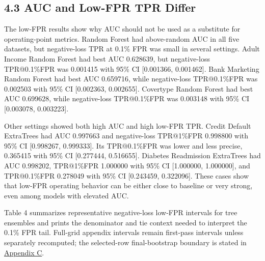 \documentclass[
  10pt,
  twocolumn]{article}
\begin{document}
\hypertarget{auc-and-low-fpr-tpr-differ}{%
\subsection{4.3 AUC and Low-FPR TPR Differ}\label{auc-and-low-fpr-tpr-differ}}

The low-FPR results show why AUC should not be used as a substitute for operating-point metrics. Random Forest had above-random AUC in all five datasets, but negative-loss TPR at 0.1\% FPR was small in several settings. Adult Income Random Forest had best AUC 0.628639, but negative-loss TPR@0.1\%FPR was 0.001415 with 95\% CI {[}0.001366, 0.001462{]}. Bank Marketing Random Forest had best AUC 0.659716, while negative-loss TPR@0.1\%FPR was 0.002503 with 95\% CI {[}0.002363, 0.002655{]}. Covertype Random Forest had best AUC 0.699628, while negative-loss TPR@0.1\%FPR was 0.003148 with 95\% CI {[}0.003078, 0.003223{]}.

Other settings showed both high AUC and high low-FPR TPR. Credit Default ExtraTrees had AUC 0.997663 and negative-loss TPR@1\%FPR 0.998800 with 95\% CI {[}0.998267, 0.999333{]}. Its TPR@0.1\%FPR was lower and less precise, 0.365415 with 95\% CI {[}0.277444, 0.516655{]}. Diabetes Readmission ExtraTrees had AUC 0.998202, TPR@1\%FPR 1.000000 with 95\% CI {[}1.000000, 1.000000{]}, and TPR@0.1\%FPR 0.278049 with 95\% CI {[}0.243459, 0.322096{]}. These cases show that low-FPR operating behavior can be either close to baseline or very strong, even among models with elevated AUC.

Table 4 summarizes representative negative-loss low-FPR intervals for tree ensembles and prints the denominator and tie context needed to interpret the 0.1\% FPR tail. Full-grid appendix intervals remain first-pass intervals unless separately recomputed; the selected-row final-bootstrap boundary is stated in \protect\hyperlink{appendix-c-final-bootstrap-boundary}{Appendix C}.
\end{document}
